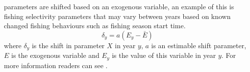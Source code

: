 \subsubsection[Exogenous]{}
parameters are shifted based on an exogenous variable, an example of this is fishing selectivity parameters that may vary between years based on known changed fishing behaviours such as fishing season start time.
\begin{equation}
\delta_y = a(E_y - \bar{E})
\end{equation}
where $\delta_y$ is the shift in parameter $X$ in year $y$, $a$ is an estimable shift parameter, $E$ is the exogenous variable and $E_y$ is the value of this variable in year $y$. For more information readers can see \cite{francis_03}.

